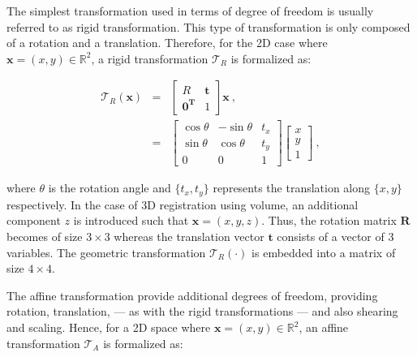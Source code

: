 The simplest transformation used in terms of degree of freedom is usually referred to as rigid transformation.
This type of transformation is only composed of a rotation and a translation.
Therefore, for the 2D case where $\mathbf{x} = (x,y) \in \mathbb{R}^2$, a rigid transformation $\mathcal{T}_R$ is formalized as:

\begin{eqnarray}
	\mathcal{T}_R(\mathbf{x}) & = & \begin{bmatrix}
		R & \mathbf{t} \\
		\mathbf{0^T} & 1
	\end{bmatrix} \mathbf{x} \ , \nonumber \\
	& = & \begin{bmatrix}
		\cos \theta & -\sin \theta & t_x \\
		\sin \theta & \cos \theta & t_y \\
		0 & 0 & 1
	\end{bmatrix}\begin{bmatrix}
		x \\
		y \\
		1
	\end{bmatrix} \ , \label{eq:rigtra} %
\end{eqnarray}

\noindent where $\theta$ is the rotation angle and $\{ t_x,t_y \}$ represents the translation along $\{x,y\}$ respectively.
In the case of 3D registration using volume, an additional component $z$ is introduced such that $\mathbf{x} = (x,y,z)$.
Thus, the rotation matrix $\mathbf{R}$ becomes of size $3 \times 3$ whereas the translation vector $\mathbf{t}$ consists of a vector of 3 variables. 
The geometric transformation $\mathcal{T}_R(\cdot)$ is embedded into a matrix of size $4 \times 4$.

The affine transformation provide additional degrees of freedom, providing rotation, translation, --- as with the rigid transformations --- and also shearing and scaling.
Hence, for a 2D space where $\mathbf{x} = (x,y) \in \mathbb{R}^2$, an affine transformation $\mathcal{T}_A$ is formalized as: 

